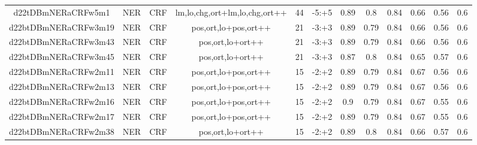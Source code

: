 \documentclass[a4paper]{article}
\begin{document}
\begin{landscape}
\begin{center}
\begin{tabular}{ |c|c|c|c|c|c|c|c|c|c|c|c|}
 	
 
 	
 		
 		\small{ d22tDBmNERaCRFw5m1 } & NER & CRF & lm,lo,chg,ort+lm,lo,chg,ort++  &  44 &  -5:+5  &  0.89 & 0.8 & 0.84  &  0.66 & 0.56 & 0.6 \\
 		

 	
 
 	
 		
 		\small{ d22btDBmNERaCRFw3m19 } & NER & CRF & pos,ort,lo+pos,ort++  &  21 &  -3:+3  &  0.89 & 0.79 & 0.84  &  0.66 & 0.56 & 0.6 \\
 		

 	
 
 	
 		
 		\small{ d22btDBmNERaCRFw3m43 } & NER & CRF & pos,ort,lo+ort++  &  21 &  -3:+3  &  0.89 & 0.79 & 0.84  &  0.66 & 0.56 & 0.6 \\
 		

 	
 
 	
 		
 		\small{ d22btDBmNERaCRFw3m45 } & NER & CRF & pos,ort,lo+ort++  &  21 &  -3:+3  &  0.87 & 0.8 & 0.84  &  0.65 & 0.57 & 0.6 \\
 		

 	
 
 	
 		
 		\small{ d22btDBmNERaCRFw2m11 } & NER & CRF & pos,ort,lo+pos,ort++  &  15 &  -2:+2  &  0.89 & 0.79 & 0.84  &  0.67 & 0.56 & 0.6 \\
 		

 	
 
 	
 		
 		\small{ d22btDBmNERaCRFw2m13 } & NER & CRF & pos,ort,lo+pos,ort++  &  15 &  -2:+2  &  0.89 & 0.79 & 0.84  &  0.67 & 0.56 & 0.6 \\
 		

 	
 
 	
 		
 		\small{ d22btDBmNERaCRFw2m16 } & NER & CRF & pos,ort,lo+pos,ort++  &  15 &  -2:+2  &  0.9 & 0.79 & 0.84  &  0.67 & 0.55 & 0.6 \\
 		

 	
 
 	
 		
 		\small{ d22btDBmNERaCRFw2m17 } & NER & CRF & pos,ort,lo+pos,ort++  &  15 &  -2:+2  &  0.89 & 0.79 & 0.84  &  0.67 & 0.55 & 0.6 \\
 		

 	
 
 	
 		
 		\small{ d22btDBmNERaCRFw2m38 } & NER & CRF & pos,ort,lo+ort++  &  15 &  -2:+2  &  0.89 & 0.8 & 0.84  &  0.66 & 0.57 & 0.6 \\
 		


\end{tabular}
\end{center}
\end{landscape}
\end{document}
